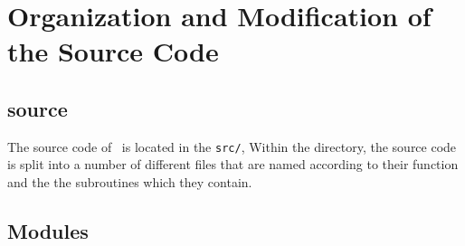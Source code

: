 \chapter{Organization and Modification of the Source Code \label{chapter:source_code}}

\section{\BATSRUS source \label{section:models}}

The source code of \BATSRUS\ is located in the {\tt src/},
Within the directory, the source code is split into
a number of different files that are named according to
their function and the the subroutines which they contain.

\section{Modules \label{section:modules}}

